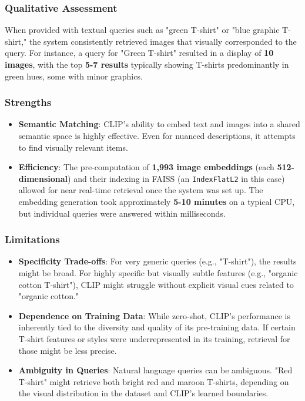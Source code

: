 \documentclass{article}
\begin{document}
\subsubsection{Qualitative Assessment}
When provided with textual queries such as "green T-shirt" or "blue graphic T-shirt," the system consistently retrieved images that visually corresponded to the query. For instance, a query for "Green T-shirt" resulted in a display of \textbf{10 images}, with the top \textbf{5-7 results} typically showing T-shirts predominantly in green hues, some with minor graphics.

\subsubsection{Strengths}
\begin{itemize}
    \item \textbf{Semantic Matching}: CLIP's ability to embed text and images into a shared semantic space is highly effective. Even for nuanced descriptions, it attempts to find visually relevant items.
    \item \textbf{Efficiency}: The pre-computation of \textbf{1,993 image embeddings} (each \textbf{512-dimensional}) and their indexing in FAISS (an \texttt{IndexFlatL2} in this case) allowed for near real-time retrieval once the system was set up. The embedding generation took approximately \textbf{5-10 minutes} on a typical CPU, but individual queries were answered within milliseconds.
\end{itemize}

\subsubsection{Limitations}
\begin{itemize}
    \item \textbf{Specificity Trade-offs}: For very generic queries (e.g., "T-shirt"), the results might be broad. For highly specific but visually subtle features (e.g., "organic cotton T-shirt"), CLIP might struggle without explicit visual cues related to "organic cotton."
    \item \textbf{Dependence on Training Data}: While zero-shot, CLIP's performance is inherently tied to the diversity and quality of its pre-training data. If certain T-shirt features or styles were underrepresented in its training, retrieval for those might be less precise.
    \item \textbf{Ambiguity in Queries}: Natural language queries can be ambiguous. "Red T-shirt" might retrieve both bright red and maroon T-shirts, depending on the visual distribution in the dataset and CLIP's learned boundaries.
\end{itemize}
\end{document}
